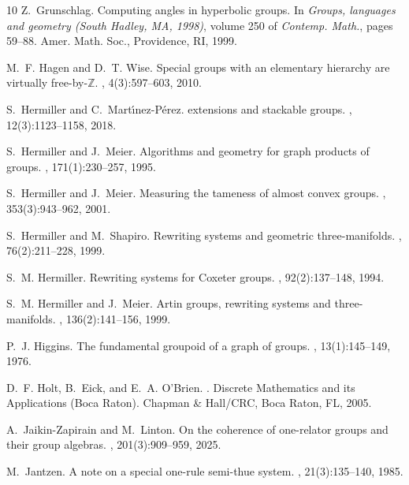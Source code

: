 \documentclass[12pt, a4paper]{amsart}
\theoremstyle{definition}
\begin{document}
\begin{thebibliography}{10}
Z.~Grunschlag.
\newblock Computing angles in hyperbolic groups.
\newblock In {\em Groups, languages and geometry ({S}outh {H}adley, {MA},
  1998)}, volume 250 of {\em Contemp. Math.}, pages 59--88. Amer. Math. Soc.,
  Providence, RI, 1999.

M.~F. Hagen and D.~T. Wise.
\newblock Special groups with an elementary hierarchy are virtually
  free-by-$\mathbb{Z}$.
, 4(3):597--603, 2010.

S.~Hermiller and C.~Mart{\'\i}nez-P{\'e}rez.
 extensions and stackable groups.
, 12(3):1123--1158, 2018.

S.~Hermiller and J.~Meier.
\newblock Algorithms and geometry for graph products of groups.
, 171(1):230--257, 1995.

S.~Hermiller and J.~Meier.
\newblock Measuring the tameness of almost convex groups.
, 353(3):943--962, 2001.

S.~Hermiller and M.~Shapiro.
\newblock Rewriting systems and geometric three-manifolds.
, 76(2):211--228, 1999.

S.~M. Hermiller.
\newblock Rewriting systems for {C}oxeter groups.
, 92(2):137--148, 1994.

S.~M. Hermiller and J.~Meier.
\newblock Artin groups, rewriting systems and three-manifolds.
, 136(2):141--156, 1999.

P.~J. Higgins.
\newblock The fundamental groupoid of a graph of groups.
, 13(1):145--149, 1976.

D.~F. Holt, B.~Eick, and E.~A. O'Brien.
.
\newblock Discrete Mathematics and its Applications (Boca Raton). Chapman \&
  Hall/CRC, Boca Raton, FL, 2005.

A.~Jaikin-Zapirain and M.~Linton.
\newblock On the coherence of one-relator groups and their group algebras.
, 201(3):909--959, 2025.

M.~Jantzen.
\newblock A note on a special one-rule semi-thue system.
, 21(3):135--140, 1985.


\end{thebibliography}
\end{document}
